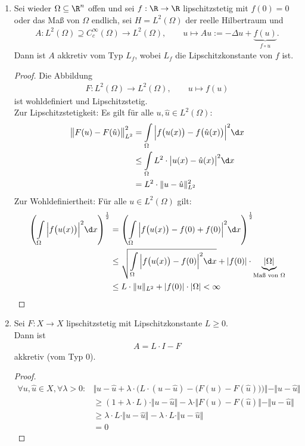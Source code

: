 \begin{beispiel}
\begin{enumerate}[label=(\alph*)]
\begin{proof}
\begin{align*}
+(\omega+L)\cdot\Vert u-\hat{u}\Vert\\
&\geq0
\end{align*}
\end{proof}
\item Sei wieder $\Omega\subseteq\R^n$ offen und sei $f:\R\to\R$ lipschitzstetig mit $f(0)=0$ oder das Maß von $\Omega$ endlich, sei $H=L^2(\Omega)$ der reelle Hilbertraum und
\begin{align*}
A:L^2(\Omega)\supseteq C_c^\infty(\Omega)\to L^2(\Omega),\qquad
u\mapsto Au:=-\Delta u+\underbrace{f(u)}_{f\circ u}.
\end{align*}
Dann ist $A$ akkretiv vom Typ $L_f$, wobei $L_f$ die Lipschitzkonstante von $f$ ist.
\begin{proof}
Die Abbildung
\begin{align*}
F: L^2(\Omega)\to L^2(\Omega),\qquad u\mapsto f(u)
\end{align*}
ist wohldefiniert und Lipschitzstetig.\\
Zur Lipschitzstetigkeit: Es gilt für alle $u,\hat{u}\in L^2(\Omega)$:
\begin{align*}
\big\Vert F(u)-F(\hat{u})\big\Vert^2_{L^2}
&=\int\limits_\Omega\Big|f\big(u(x)\big)-f\big(\hat{u}(x)\big)\Big|^2\d x\\
&\leq
\int\limits_\Omega L^2\cdot\big|u(x)-\hat{u}(x)\big|^2\d x\\
&=L^2\cdot\Vert u-\hat{u}\Vert^2_{L^2}
\end{align*}
Zur Wohldefiniertheit: Für alle $u\in L^2(\Omega)$ gilt:
\begin{align*}
\left(\int\limits_\Omega\Big|f\big(u(x)\big)\Big|^2\d x\right)^{\frac{1}{2}}
&=\left(\int\limits_\Omega\Big|f\big(u(x)\big)-f(0)+f(0)\Big|^2\d x\right)^{\frac{1}{2}}\\
&\leq
\sqrt{\int\limits_\Omega\Big|f\big(u(x)\big)-f(0)\Big|^2\d x}+|f(0)|\cdot\underbrace{|\Omega|}_{\text{Maß von }\Omega}\\
&\leq
L\cdot\Vert u\Vert_{L^2}+|f(0)|\cdot|\Omega|<\infty
\end{align*}
\end{proof}
\item Sei $F:X\to X$ lipschitzstetig mit Lipschitzkonstante $L\geq0$.\\
Dann ist 
\begin{align*}
A=L\cdot I-F
\end{align*}
akkretiv (vom Typ $0$).
\begin{proof}
\begin{align*}
\forall u,\hat{u}\in X,\forall \lambda>0:
&\bigg\Vert u-\hat{u}+\lambda\cdot\Big(L\cdot(u-\hat{u})-\big(F(u)-F(\hat{u})\big)\Big)\bigg\Vert-\Vert u-\hat{u}\Vert\\
&\geq
(1+\lambda\cdot L)\cdot\Vert u-\hat{u}\Vert-\lambda\cdot\Vert F(u)-F(\hat{u})\Vert-\Vert u-\hat{u}\Vert\\
&\geq
\lambda\cdot L\cdot\Vert u-\hat{u}\Vert-\lambda\cdot L\cdot\Vert u-\hat{u}\Vert\\
&=0
\end{align*}
\end{proof}
\end{enumerate}
\end{beispiel}

